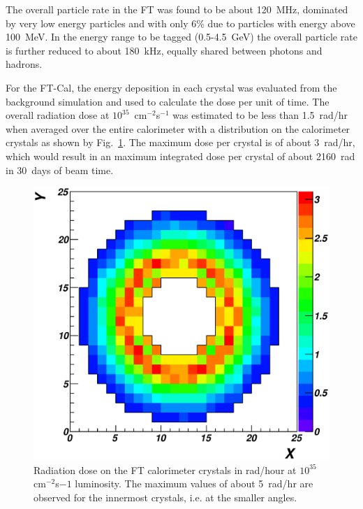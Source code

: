 The overall particle rate in the FT was found to be about 120~MHz, dominated by very low energy particles and with
only 6\% due to particles with energy above 100~MeV. In the energy range to be tagged (0.5-4.5~GeV) the overall
particle rate is further reduced to about 180~kHz, equally shared between photons and hadrons. 

For the FT-Cal, the energy deposition in each crystal was evaluated from the background simulation and used to
calculate the dose per unit of time. The overall radiation dose at $10^{35}$~cm$^{-2}$s$^{-1}$ was estimated to be
less than 1.5~rad/hr when averaged over the entire calorimeter with a distribution on the calorimeter crystals as
shown by Fig.~\ref{fig:ft_rad}. The maximum dose per crystal is of about 3~rad/hr, which would result in an
maximum integrated dose per crystal of about 2160~rad in 30~days of beam time.

\begin{figure}
\includegraphics[height=\columnwidth]{fig/ft_rad.eps}
\caption{Radiation dose on the FT calorimeter crystals in rad/hour at $10^{35}$ cm$^{-2}$s${-1}$ luminosity. The
  maximum values of about 5~rad/hr are observed for the innermost crystals, i.e. at the smaller angles.}
\label{fig:ft_rad}
\end{figure}
